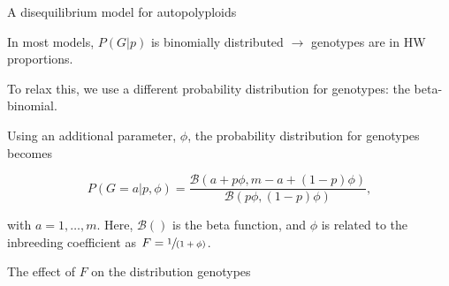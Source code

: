 \documentclass[presentation,sansserif]{beamer}
\begin{document}
\begin{frame}[t]{A disequilibrium model for autopolyploids}

  In most models, $P(G|p)$ is binomially distributed $\rightarrow$ genotypes are in HW proportions.
  \vspace{0.3in}
  \pause
  
  To relax this, we use a different probability distribution for genotypes: the beta-binomial.
  \vspace{0.3in}
  \pause
  
  Using an additional parameter, $\phi$, the probability distribution for genotypes becomes
  \vspace{0.1in}
  
  \begin{equation}
    P(G=a|p,\phi) = \frac{\mathcal{B}(a + p\phi, m - a + (1-p)\phi)}{\mathcal{B}(p\phi, (1-p)\phi)},
  \end{equation}
  \vspace{0.2in}

  

with $a = 1,\dots,m$. \pause Here, $\mathcal{B}()$ is the beta function, and $\phi$ is related to the inbreeding coefficient as $F = \sfrac{1}{(1+\phi)}$.

\end{frame}

{  
\begin{frame}[c,plain]{The effect of $F$ on the distribution genotypes}
\pause

  \begin{center}
  \end{center}
  
\end{frame}

}
\end{document}
